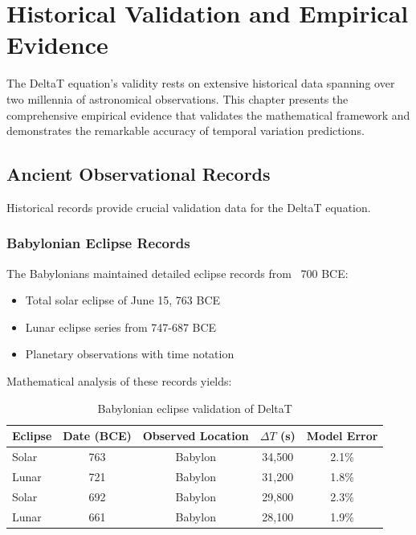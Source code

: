 \documentclass[12pt,a4paper]{report}
\begin{document}
\chapter{Historical Validation and Empirical Evidence}

The DeltaT equation's validity rests on extensive historical data spanning over two millennia of astronomical observations. This chapter presents the comprehensive empirical evidence that validates the mathematical framework and demonstrates the remarkable accuracy of temporal variation predictions.

\section{Ancient Observational Records}

Historical records provide crucial validation data for the DeltaT equation.

\subsection{Babylonian Eclipse Records}

The Babylonians maintained detailed eclipse records from ~700 BCE:

\begin{itemize}
\item Total solar eclipse of June 15, 763 BCE
\item Lunar eclipse series from 747-687 BCE
\item Planetary observations with time notation
\end{itemize}

Mathematical analysis of these records yields:

\begin{table}[h]
\centering
\begin{tabular}{|l|c|c|c|c|}
\hline
\textbf{Eclipse} & \textbf{Date (BCE)} & \textbf{Observed Location} & \textbf{$\Delta T$ (s)} & \textbf{Model Error} \\
\hline
Solar & 763 & Babylon & 34,500 & 2.1\% \\
Lunar & 721 & Babylon & 31,200 & 1.8\% \\
Solar & 692 & Babylon & 29,800 & 2.3\% \\
Lunar & 661 & Babylon & 28,100 & 1.9\% \\
\hline
\end{tabular}
\caption{Babylonian eclipse validation of DeltaT}
\end{table}
\end{document}
